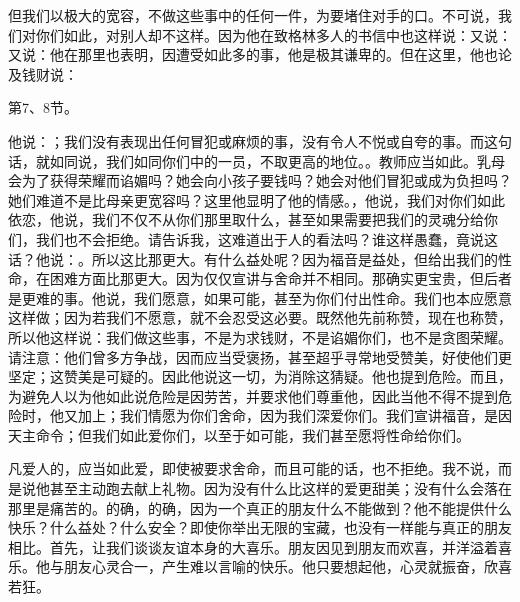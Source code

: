 但我们以极大的宽容，不做这些事中的任何一件，为要堵住对手的口。不可说，我们对你们如此，对别人却不这样。因为他在致格林多人的书信中也这样说：又说：又说：他在那里也表明，因遭受如此多的事，他是极其谦卑的。但在这里，他也论及钱财说：\par

第7、8节。\par

他说：；我们没有表现出任何冒犯或麻烦的事，没有令人不悦或自夸的事。而这句话，就如同说，我们如同你们中的一员，不取更高的地位。。教师应当如此。乳母会为了获得荣耀而谄媚吗？她会向小孩子要钱吗？她会对他们冒犯或成为负担吗？她们难道不是比母亲更宽容吗？这里他显明了他的情感。，他说，我们对你们如此依恋，他说，我们不仅不从你们那里取什么，甚至如果需要把我们的灵魂分给你们，我们也不会拒绝。请告诉我，这难道出于人的看法吗？谁这样愚蠢，竟说这话？他说：。所以这比那更大。有什么益处呢？因为福音是益处，但给出我们的性命，在困难方面比那更大。因为仅仅宣讲与舍命并不相同。那确实更宝贵，但后者是更难的事。他说，我们愿意，如果可能，甚至为你们付出性命。我们也本应愿意这样做；因为若我们不愿意，就不会忍受这必要。既然他先前称赞，现在也称赞，所以他这样说：我们做这些事，不是为求钱财，不是谄媚你们，也不是贪图荣耀。请注意：他们曾多方争战，因而应当受褒扬，甚至超乎寻常地受赞美，好使他们更坚定；这赞美是可疑的。因此他说这一切，为消除这猜疑。他也提到危险。而且，为避免人以为他如此说危险是因劳苦，并要求他们尊重他，因此当他不得不提到危险时，他又加上；我们情愿为你们舍命，因为我们深爱你们。我们宣讲福音，是因天主命令；但我们如此爱你们，以至于如可能，我们甚至愿将性命给你们。\par

凡爱人的，应当如此爱，即使被要求舍命，而且可能的话，也不拒绝。我不说，而是说他甚至主动跑去献上礼物。因为没有什么比这样的爱更甜美；没有什么会落在那里是痛苦的。的确，的确，因为一个真正的朋友什么不能做到？他不能提供什么快乐？什么益处？什么安全？即使你举出无限的宝藏，也没有一样能与真正的朋友相比。首先，让我们谈谈友谊本身的大喜乐。朋友因见到朋友而欢喜，并洋溢着喜乐。他与朋友心灵合一，产生难以言喻的快乐。他只要想起他，心灵就振奋，欣喜若狂。\par

